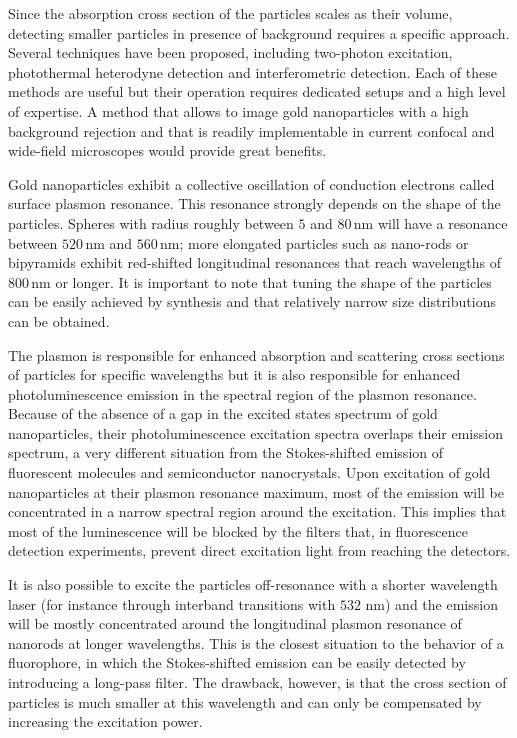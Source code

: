\documentclass[journal=nalefd,manuscript=letter]{achemso}
\newcommand{\nm}{\ensuremath{\,\textrm{nm}}}
\begin{document}
Since the absorption cross section of the particles scales as their volume, detecting
smaller particles in presence of background requires a specific approach.
Several techniques have been proposed, including two-photon
excitation\cite{VandenBroek2013}, photothermal \mbox{heterodyne}
detection\cite{Berciaud2006} and interferometric detection\cite{Ignatovich2006}.
Each of these methods are useful but their operation requires dedicated setups
and a high level of expertise. A method that allows to image gold nanoparticles with
a high background rejection and that is readily implementable in current
confocal and wide-field microscopes would provide great benefits.

Gold nanoparticles exhibit a collective oscillation of conduction electrons
called surface plasmon resonance\cite{Bouhelier2005}. This resonance strongly
depends on the shape of the particles\cite{Dulkeith2004}\cite{Link2000a}.
Spheres with radius roughly between $5$ and $80\nm$ will have a resonance
between $520\nm$ and $560\nm$; more elongated particles such as nano-rods or
bipyramids\cite{Rao2015} exhibit red-shifted longitudinal resonances that reach
wavelengths of $800\nm$ or longer\cite{Ngoc2015}. It is important to note that
tuning the shape of the particles can be easily achieved by synthesis and that
relatively narrow size distributions can be obtained\cite{Nikoobakht2003}.

The plasmon is responsible for enhanced absorption and scattering cross
sections\cite{Ni2008} of particles for specific wavelengths but it is also
responsible for enhanced photoluminescence emission in the spectral region of
the plasmon resonance. Because of the absence of a gap in the excited states
spectrum of gold nanoparticles, their photoluminescence excitation spectra
overlaps their emission spectrum\cite{Yorulmaz2012}, a very different situation
from the Stokes-shifted emission of fluorescent molecules and semiconductor
nanocrystals. Upon excitation of gold nanoparticles at their plasmon resonance
maximum, most of the emission will be concentrated in a narrow spectral region
around the excitation. This implies that most of the luminescence will be
blocked by the filters that, in fluorescence detection experiments, prevent
direct excitation light from reaching the detectors.

It is also possible to excite the particles off-resonance with a shorter
wavelength laser (for instance through interband transitions with $532\,\nm$)
and the emission will be mostly concentrated around the longitudinal plasmon
resonance of nanorods at longer wavelengths. This is the closest situation to
the behavior of a fluorophore, in which the Stokes-shifted emission can be
easily detected by introducing a long-pass filter. The drawback, however, is
that the cross section of particles is much smaller at this wavelength and can
only be compensated by increasing the excitation power.
\end{document}
